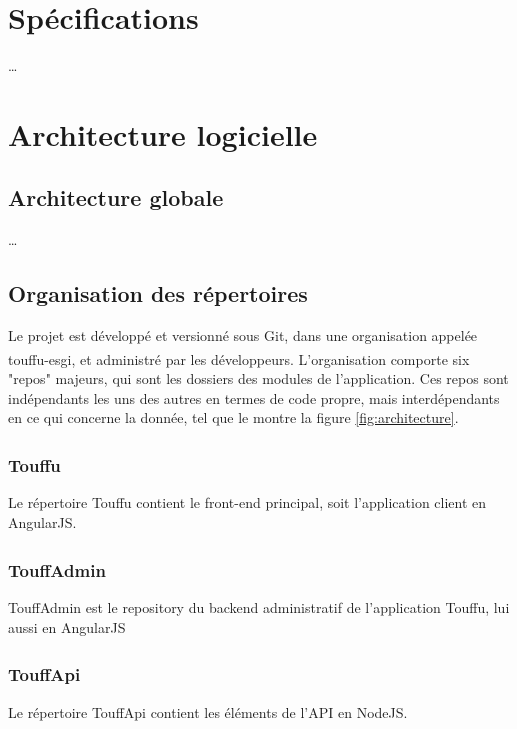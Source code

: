 \documentclass[conference]{IEEEtran}
\newcommand{\bibRef}[1]
{\textsuperscript{\cite{#1}}}
\begin{document}
\section{Spécifications}
…

\section{Architecture logicielle}

\subsection{Architecture globale}

…

\subsection{Organisation des répertoires}

Le projet est développé et versionné sous Git, dans une organisation appelée touffu-esgi\bibRef{touffu-esgi}, et administré par les développeurs. L'organisation comporte six "repos" majeurs, qui sont les dossiers des modules de l'application. Ces repos sont indépendants les uns des autres en termes de code propre, mais interdépendants en ce qui concerne la donnée, tel que le montre la figure \ref{fig:architecture}.\\

\subsubsection*{Touffu\bibRef{Touffu} }

Le répertoire Touffu contient le front-end principal, soit l'application client en AngularJS.\\

\subsubsection*{TouffAdmin\bibRef{TouffAdmin} }

TouffAdmin est le repository du backend administratif de l'application Touffu, lui aussi en AngularJS\\

\subsubsection*{TouffApi\bibRef{TouffApi} }

Le répertoire TouffApi contient les éléments de l'API en NodeJS.\\
\end{document}
